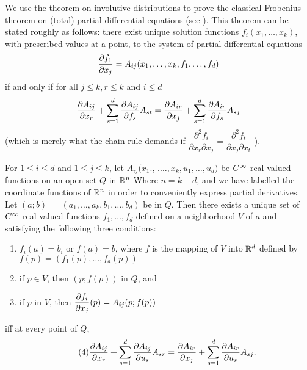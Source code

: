 \documentclass[../main]{subfiles}
\begin{document}
We use the theorem on involutive distributions to prove the classical Frobenius theorem on (total) partial differential equations (see \cite{levi1977absolute}). This theorem can be stated roughly as follows: there exist unique solution functions $f_{i}(x_{1}, \ldots, x_{k})$, with prescribed values at a point, to the system of partial differential equations
\[
\dfrac{\partial f_1}{\partial x_j}=A_{i j}(x_{1}, \ldots, x_{k}, f_{1}, \ldots, f_{d})
\]
if and only if for all $j \leq k, r \leq k$ and $i \leq d$
\[
\dfrac{\partial A_{ij}}{\partial x_r}+\sum_{s=1}^{d} \dfrac{\partial A_{ij}}{\partial f_s}A_{s t}=\dfrac{\partial A_{ir}}{\partial x_j}+\sum_{s=1}^{d} \dfrac{\partial A_{ir}}{\partial f_s} A_{s j}
\]
(which is merely what the chain rule demands if $\dfrac{\partial^{2} f_{i}}{\partial x_{r} \partial x_{j}}=\dfrac{\partial^{2} f_{t}}{\partial x_{j} \partial x_{t}}$ ). 

\begin{theorem}[Frobenius]\label{thm:ch09.1.3}
For $1 \leq i \leq d$ and $1 \leq j \leq k$, let \newline $A_{i j}(x_{1}.$, $.\ldots, x_{k}, u_{1}, \ldots, u_{d})$ be $C^\infty$ real valued functions on an open set $Q$ in $\mathbb{R}^{n}$ Where $n=k+d$, and we have labelled the coordinate functions of $\mathbb{R}^{n}$ in order to conveniently express partial derivatives. Let $(a ; b)=$ $(a_{1}, \ldots, a_{k}, b_{1}, \ldots, b_{d})$ be in $Q .$ Then there exists a unique set of $C^\infty$ real valued functions $f_{1}, \ldots, f_{d}$ defined on a neighborhood $V$ of $a$ and satisfying the following three conditions:
\begin{enumerate}[label=(\arabic*)]
    \item $f_{i}(a)=b_{i}$ or $f(a)=b$, where $f$ is the mapping of $V$ into $\mathbb{R}^{d}$ defined by $f(p)=(f_{1}(p), \ldots, f_{d}(p))$ \label{enu:9.1.1}
    \item if $p\in V$, then $(p; f(p))$ in $Q$, and \label{enu:9.1.2}
    \item if $p$ in $V$, then $\dfrac{\partial f_i}{\partial x_j}(p)=A_{i j}(p ; f(p))$ \label{enu:9.1.3}
\end{enumerate}
iff at every point of $Q$,
\[\tag{4}\label{enu:9.1.4} \dfrac{\partial A_{ij}}{\partial x_r}+\sum_{s=1}^d \dfrac{\partial A_{ij}}{\partial u_s} A_{sr} = \dfrac{\partial A_{ir}}{\partial x_j} +\sum_{s=1}^d \dfrac{\partial A_{ir}}{\partial u_s} A_{sj}.\]
\end{theorem} 
\end{document}
